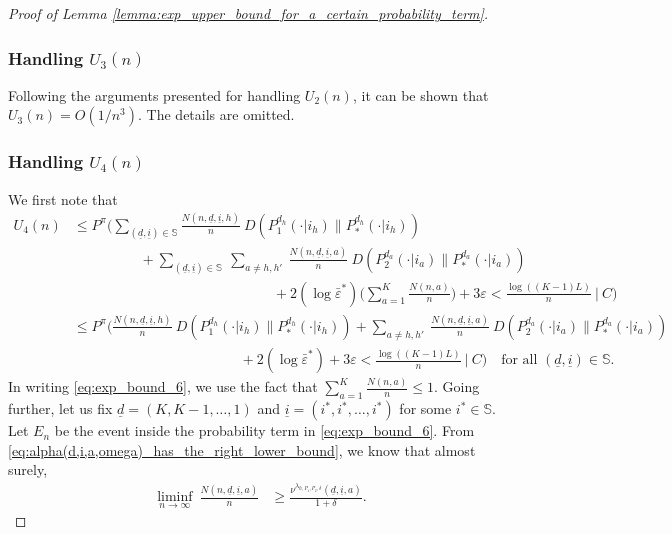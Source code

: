 \begin{proof}[Proof of Lemma \ref{lemma:exp_upper_bound_for_a_certain_probability_term}]
\subsubsection{Handling $U_3(n)$}
Following the arguments presented for handling $U_2(n)$, it can be shown that $U_3(n)=O(1/n^3)$. The details are omitted.

\subsubsection{Handling $U_4(n)$}
We first note that
\begin{align}
	U_4(n)&\leq P^\pi\bigg(\sum\limits_{(\underline{d},\underline{i})\in \mathbb{S}}\frac{N(n, \underline{d}, \underline{i}, h)}{n}~D(P_1^{d_h}(\cdot|i_h)\|P_*^{d_h}(\cdot|i_h))\nonumber\\
	&\hspace{2cm}+\sum\limits_{(\underline{d},\underline{i})\in \mathbb{S}}~\sum\limits_{a\neq h, h'}~\frac{N(n, \underline{d}, \underline{i}, a)}{n}~D(P_2^{d_a}(\cdot|i_a)\|P_*^{d_a}(\cdot|i_a)) \nonumber\\
		&\hspace{6cm} + 2(\log \bar{\varepsilon}^*)\bigg(\sum\limits_{a=1}^{K}\frac{N(n, a)}{n}\bigg) + 3\varepsilon  < \frac{\log ((K-1)L)}{n}  ~\bigg|~C\bigg)\nonumber\\
		&\leq P^\pi\bigg(\frac{N(n, \underline{d}, \underline{i}, h)}{n}~D(P_1^{d_h}(\cdot|i_h)\|P_*^{d_h}(\cdot|i_h))+\sum\limits_{a\neq h, h'}~\frac{N(n, \underline{d}, \underline{i}, a)}{n}~D(P_2^{d_a}(\cdot|i_a)\|P_*^{d_a}(\cdot|i_a)) \nonumber\\
		&\hspace{5cm} + 2(\log \bar{\varepsilon}^*)+ 3\varepsilon  < \frac{\log ((K-1)L)}{n}  ~\bigg|~C\bigg)\quad \text{for all }(\underline{d}, \underline{i})\in \mathbb{S}.
		\label{eq:exp_bound_6}
\end{align}
In writing \eqref{eq:exp_bound_6}, we use the fact that $\sum\limits_{a=1}^{K}\frac{N(n, a)}{n}\leq 1$. Going further, let us fix $\underline{d}=(K, K-1,\ldots, 1)$ and $\underline{i}=(i^*, i^*, \ldots, i^*)$ for some $i^*\in \mathbb{S}$. Let $E_n$ be the event inside the probability term in \eqref{eq:exp_bound_6}. From \eqref{eq:alpha(d,i,a,omega)_has_the_right_lower_bound}, we know that almost surely,
\begin{align}
	\liminf\limits_{n\to \infty}~\frac{N(n, \underline{d}, \underline{i}, a)}{n}&\geq \frac{\nu^{\lambda_{h, P_1, P_2, \delta}}(\underline{d}, \underline{i}, a)}{1+\delta}.
	\label{eq:exp_bound_7}

\end{align}
\end{proof}
